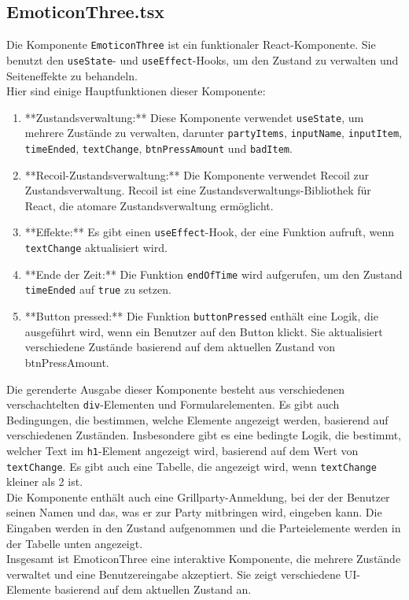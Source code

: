 \documentclass[./dokumentation.tex]{subfiles}
\begin{document}
\subsection{EmoticonThree.tsx}

Die Komponente \verb+EmoticonThree+ ist ein funktionaler React-Komponente. Sie benutzt den \verb+useState+- und \verb+useEffect+-Hooks, um den Zustand zu verwalten und Seiteneffekte zu behandeln.\\ 
Hier sind einige Hauptfunktionen dieser Komponente:\\
\begin{enumerate}
    \item  **Zustandsverwaltung:** Diese Komponente verwendet \verb+useState+, um mehrere Zustände zu verwalten, darunter \verb+partyItems+, \verb+inputName+, \verb+inputItem+, \verb+timeEnded+, \verb+textChange+, \verb+btnPressAmount+ und \verb+badItem+.\\
    \item **Recoil-Zustandsverwaltung:** Die Komponente verwendet Recoil zur Zustandsverwaltung. Recoil ist eine Zustandsverwaltungs-Bibliothek für React, die atomare Zustandsverwaltung ermöglicht.\\
    \item  **Effekte:** Es gibt einen \verb+useEffect+-Hook, der eine Funktion aufruft, wenn \verb+textChange+ aktualisiert wird.\\
    \item  **Ende der Zeit:** Die Funktion \verb+endOfTime+ wird aufgerufen, um den Zustand \verb+timeEnded+ auf \verb+true+ zu setzen.\\
    \item **Button pressed:** Die Funktion \verb+buttonPressed+ enthält eine Logik, die ausgeführt wird, wenn ein Benutzer auf den Button klickt. Sie aktualisiert verschiedene Zustände basierend auf dem aktuellen Zustand von btnPressAmount.\\
\end{enumerate}
Die gerenderte Ausgabe dieser Komponente besteht aus verschiedenen verschachtelten \verb+div+-Elementen und Formularelementen. Es gibt auch Bedingungen, die bestimmen, welche Elemente angezeigt werden, basierend auf verschiedenen Zuständen. Insbesondere gibt es eine bedingte Logik, die bestimmt, welcher Text im \verb+h1+-Element angezeigt wird, basierend auf dem Wert von \verb+textChange+. Es gibt auch eine Tabelle, die angezeigt wird, wenn \verb+textChange+ kleiner als 2 ist.\\
Die Komponente enthält auch eine Grillparty-Anmeldung, bei der der Benutzer seinen Namen und das, was er zur Party mitbringen wird, eingeben kann. Die Eingaben werden in den Zustand aufgenommen und die Parteielemente werden in der Tabelle unten angezeigt.\\
Insgesamt ist EmoticonThree eine interaktive Komponente, die mehrere Zustände verwaltet und eine Benutzereingabe akzeptiert. Sie zeigt verschiedene UI-Elemente basierend auf dem aktuellen Zustand an.
\end{document}
